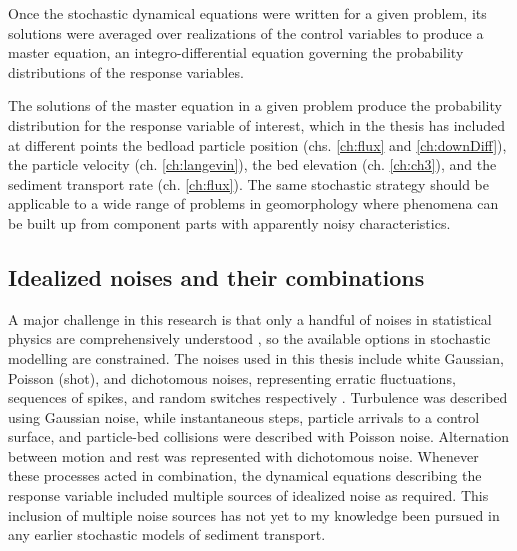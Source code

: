 Once the stochastic dynamical equations were written for a given problem, its solutions were averaged over realizations of the control variables to produce a master equation, an integro-differential equation governing the probability distributions of the response variables.

The solutions of the master equation in a given problem produce the probability distribution for the response variable of interest, which in the thesis has included at different points the bedload particle position (chs. \ref{ch:flux} and \ref{ch:downDiff}), the particle velocity (ch. \ref{ch:langevin}), the bed elevation (ch. \ref{ch:ch3}), and the sediment transport rate (ch. \ref{ch:flux}).
The same stochastic strategy should be applicable to a wide range of problems in geomorphology where phenomena can be built up from component parts with apparently noisy characteristics.


\subsection{Idealized noises and their combinations}

A major challenge in this research is that only a handful of noises in statistical physics are comprehensively understood \citep{Horsthemke1984}, so the available options in stochastic modelling are constrained.
The noises used in this thesis include white Gaussian, Poisson (shot), and dichotomous noises, representing erratic fluctuations, sequences of spikes, and random switches respectively \citep{VanDenBroeck1983}.
Turbulence was described using Gaussian noise, while instantaneous steps, particle arrivals to a control surface, and particle-bed collisions were described with Poisson noise. Alternation between motion and rest was represented with dichotomous noise.
Whenever these processes acted in combination, the dynamical equations describing the response variable included multiple sources of idealized noise as required.
This inclusion of multiple noise sources has not yet to my knowledge been pursued in any earlier stochastic models of sediment transport.

